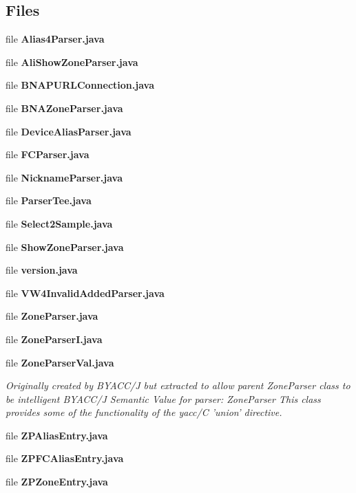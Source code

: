 \subsection*{Files}
\begin{DoxyCompactItemize}
\item 
file {\bf Alias4\+Parser.\+java}
\item 
file {\bf Ali\+Show\+Zone\+Parser.\+java}
\item 
file {\bf B\+N\+A\+P\+U\+R\+L\+Connection.\+java}
\item 
file {\bf B\+N\+A\+Zone\+Parser.\+java}
\item 
file {\bf Device\+Alias\+Parser.\+java}
\item 
file {\bf F\+C\+Parser.\+java}
\item 
file {\bf Nickname\+Parser.\+java}
\item 
file {\bf Parser\+Tee.\+java}
\item 
file {\bf Select2\+Sample.\+java}
\item 
file {\bf Show\+Zone\+Parser.\+java}
\item 
file {\bf version.\+java}
\item 
file {\bf V\+W4\+Invalid\+Added\+Parser.\+java}
\item 
file {\bf Zone\+Parser.\+java}
\item 
file {\bf Zone\+Parser\+I.\+java}
\item 
file {\bf Zone\+Parser\+Val.\+java}
\begin{DoxyCompactList}\small\item\em Originally created by B\+Y\+A\+C\+C/\+J but extracted to allow parent Zone\+Parser class to be intelligent B\+Y\+A\+C\+C/\+J Semantic Value for parser\+: Zone\+Parser This class provides some of the functionality of the yacc/\+C 'union' directive. \end{DoxyCompactList}\item 
file {\bf Z\+P\+Alias\+Entry.\+java}
\item 
file {\bf Z\+P\+F\+C\+Alias\+Entry.\+java}
\item 
file {\bf Z\+P\+Zone\+Entry.\+java}
\end{DoxyCompactItemize}
